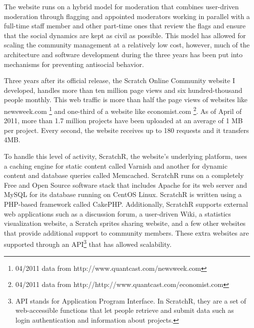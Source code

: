 The website runs on a hybrid model for moderation that combines user-driven moderation through flagging and appointed moderators working in parallel with a full-time staff member and other part-time ones that review the flags and ensure that the social dynamics are kept as civil as possible. 
This model has allowed for scaling the community management at a relatively low cost, however, much of the architecture and software development during the three years has been put into mechanisms for preventing antisocial behavior.

Three years after its official release, the Scratch Online Community website I developed, handles more than ten million page views and six hundred-thousand people monthly.
This web traffic is more than half the page views of websites like newsweek.com \footnote{04/2011 data from http://www.quantcast.com/newsweek.com} and one-third of a website like economist.com \footnote{04/2011 data from http://http://www.quantcast.com/economist.com}.
As of April of 2011, more than 1.7 million projects have been uploaded at an average of 1 MB per project. 
Every second, the website receives up to 180 requests and it transfers 4MB.

To handle this level of activity, ScratchR, the website's underlying platform, uses a caching engine for static content called Varnish and another for dynamic content and database queries called Memcached. 
ScratchR runs on a completely Free and Open Source software stack that includes Apache for its web server and MySQL for its database running on CentOS Linux. 
ScratchR is written using a PHP-based framework called CakePHP.
Additionally, ScratchR supports external  web applications such as a discussion forum, a user-driven Wiki, a statistics visualization website, a Scratch sprites sharing website, and a few other websites that provide additional support to community members. 
These extra websites are supported through an API\footnote{API stands for Application Program Interface. In ScratchR, they are a set of web-accessible functions that let people retrieve and submit data such as login authentication and information about projects.} that has allowed scalability.
